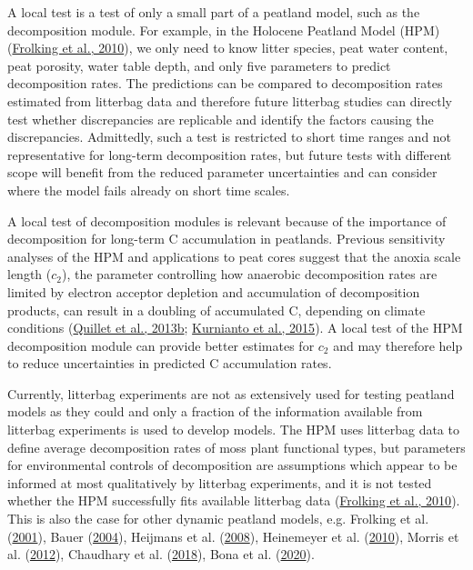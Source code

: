\documentclass[
  12pt,
]{article}
\begin{document}
A local test is a test of only a small part of a peatland model, such as the decomposition module. For example, in the Holocene Peatland Model (HPM) (\protect\hyperlink{ref-Frolking.2010}{Frolking et al., 2010}), we only need to know litter species, peat water content, peat porosity, water table depth, and only five parameters to predict decomposition rates. The predictions can be compared to decomposition rates estimated from litterbag data and therefore future litterbag studies can directly test whether discrepancies are replicable and identify the factors causing the discrepancies. Admittedly, such a test is restricted to short time ranges and not representative for long-term decomposition rates, but future tests with different scope will benefit from the reduced parameter uncertainties and can consider where the model fails already on short time scales.

A local test of decomposition modules is relevant because of the importance of decomposition for long-term C accumulation in peatlands. Previous sensitivity analyses of the HPM and applications to peat cores suggest that the anoxia scale length (\(c_2\)), the parameter controlling how anaerobic decomposition rates are limited by electron acceptor depletion and accumulation of decomposition products, can result in a doubling of accumulated C, depending on climate conditions (\protect\hyperlink{ref-Quillet.2013a}{Quillet et al., 2013b}; \protect\hyperlink{ref-Kurnianto.2015}{Kurnianto et al., 2015}). A local test of the HPM decomposition module can provide better estimates for \(c_2\) and may therefore help to reduce uncertainties in predicted C accumulation rates.

Currently, litterbag experiments are not as extensively used for testing peatland models as they could and only a fraction of the information available from litterbag experiments is used to develop models. The HPM uses litterbag data to define average decomposition rates of moss plant functional types, but parameters for environmental controls of decomposition are assumptions which appear to be informed at most qualitatively by litterbag experiments, and it is not tested whether the HPM successfully fits available litterbag data (\protect\hyperlink{ref-Frolking.2010}{Frolking et al., 2010}). This is also the case for other dynamic peatland models, e.g. Frolking et al. (\protect\hyperlink{ref-Frolking.2001}{2001}), Bauer (\protect\hyperlink{ref-Bauer.2004}{2004}), Heijmans et al. (\protect\hyperlink{ref-Heijmans.2008}{2008}), Heinemeyer et al. (\protect\hyperlink{ref-Heinemeyer.2010}{2010}), Morris et al. (\protect\hyperlink{ref-Morris.2012}{2012}), Chaudhary et al. (\protect\hyperlink{ref-Chaudhary.2018}{2018}), Bona et al. (\protect\hyperlink{ref-Bona.2020}{2020}).
\end{document}
